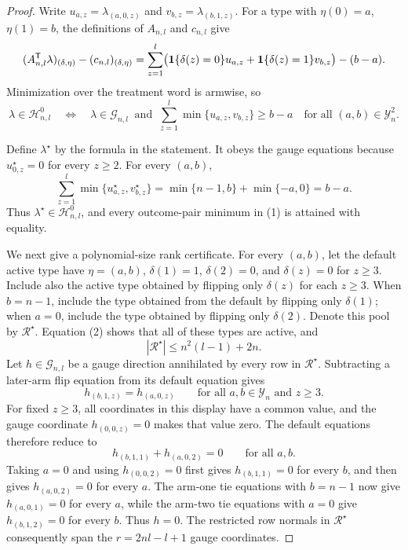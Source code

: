 \documentclass{article}
\begin{document}
\begin{proof}
Write \(u_{a,z}=\lambda_{(a,0,z)}\) and \(v_{b,z}=\lambda_{(b,1,z)}\). For a type with \(\eta(0)=a\), \(\eta(1)=b\), the definitions of \(A_{n,l}\) and \(c_{n,l}\) give
\[
\makebox[\linewidth][c]{\resizebox{0.98\linewidth}{!}{\par\noindent \makebox[\linewidth][c]{\resizebox{0.98\linewidth}{!}{\(\displaystyle \displaystyle (A_{n,l}^{\mathsf T}\lambda)_{(\delta,\eta)}-(c_{n,l})_{(\delta,\eta)}=\sum_{z=1}^l\bigl(\mathbf 1\{\delta(z)=0\}u_{a,z}+\mathbf 1\{\delta(z)=1\}v_{b,z}\bigr)-(b-a).\)}}\par\noindent}}
\]
Minimization over the treatment word is armwise, so
\[\lambda\in\mathcal H^0_{n,l}\quad\Longleftrightarrow\quad \lambda\in\mathcal G_{n,l}\ \text{ and }\ \sum_{z=1}^l\min\{u_{a,z},v_{b,z}\}\ge b-a\quad\text{for all }(a,b)\in\mathcal Y_n^2.\tag{1}\]

Define \(\lambda^\star\) by the formula in the statement. It obeys the gauge equations because \(u^\star_{0,z}=0\) for every \(z\ge2\). For every \((a,b)\),
\[\sum_{z=1}^l\min\{u^\star_{a,z},v^\star_{b,z}\}=\min\{n-1,b\}+\min\{-a,0\}=b-a.\tag{2}\]
Thus \(\lambda^\star\in\mathcal H^0_{n,l}\), and every outcome-pair minimum in (1) is attained with equality.

We next give a polynomial-size rank certificate. For every \((a,b)\), let the default active type have \(\eta=(a,b)\), \(\delta(1)=1\), \(\delta(2)=0\), and \(\delta(z)=0\) for \(z\ge3\). Include also the active type obtained by flipping only \(\delta(z)\) for each \(z\ge3\). When \(b=n-1\), include the type obtained from the default by flipping only \(\delta(1)\); when \(a=0\), include the type obtained by flipping only \(\delta(2)\). Denote this pool by \(\mathcal R^\star\). Equation (2) shows that all of these types are active, and
\[|\mathcal R^\star|\le n^2(l-1)+2n.\tag{3}\]
Let \(h\in\mathcal G_{n,l}\) be a gauge direction annihilated by every row in \(\mathcal R^\star\). Subtracting a later-arm flip equation from its default equation gives
\[h_{(b,1,z)}=h_{(a,0,z)}\qquad\text{for all }a,b\in\mathcal Y_n\text{ and }z\ge3.\]
For fixed \(z\ge3\), all coordinates in this display have a common value, and the gauge coordinate \(h_{(0,0,z)}=0\) makes that value zero. The default equations therefore reduce to
\[h_{(b,1,1)}+h_{(a,0,2)}=0\qquad\text{for all }a,b.\]
Taking \(a=0\) and using \(h_{(0,0,2)}=0\) first gives \(h_{(b,1,1)}=0\) for every \(b\), and then gives \(h_{(a,0,2)}=0\) for every \(a\). The arm-one tie equations with \(b=n-1\) now give \(h_{(a,0,1)}=0\) for every \(a\), while the arm-two tie equations with \(a=0\) give \(h_{(b,1,2)}=0\) for every \(b\). Thus \(h=0\). The restricted row normals in \(\mathcal R^\star\) consequently span the \(r=2nl-l+1\) gauge coordinates.


\end{proof}
\end{document}
